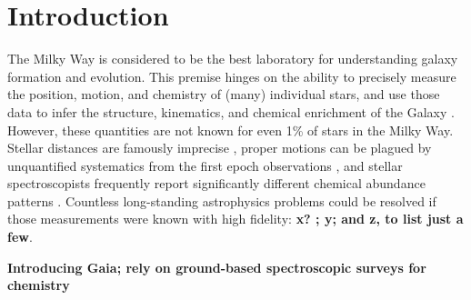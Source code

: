 \documentclass[preprint,trackchanges]{aastex}
\newcommand{\stub}[1]{\textbf{#1}}
\begin{document}
\keywords{}

\section{Introduction} 
\label{sec:introduction}

The Milky Way is considered to be the best laboratory for understanding galaxy
formation and evolution.  This premise hinges on the ability to precisely measure 
the position, motion, and chemistry of (many) individual stars, and use those data 
to infer the structure, kinematics, and chemical enrichment of the Galaxy 
\citep[e.g.,][]{Deason_2011,Ness_2012,Ness_2013a,Ness_2013b,Casey_2012,Casey_2013,
Casey_2014a,Casey_2014b}.  %
However, these quantities are not known for even 1\% of stars in the Milky Way.  
Stellar distances are famously imprecise \citep[e.g.,][]{van_Leeuwen_2007,
Jofre_2015,Madler_2016}, proper motions can be plagued by unquantified systematics
from the first epoch observations \citep[e.g.,][]{Casey_Schlaufman_2015}, and 
stellar spectroscopists frequently report significantly different chemical 
abundance patterns \citep{Smiljanic_2014}.  Countless long-standing astrophysics
problems could be resolved if those measurements were known with high fidelity: 
\stub{x? \citep{someone}; y; and z, to list just a few}.


\stub{Introducing Gaia; rely on ground-based spectroscopic surveys for chemistry}
\end{document}

